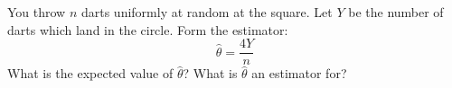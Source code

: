 \documentclass[12pt]{article}
\begin{document}
\begin{enumerate}
You throw $n$ darts uniformly at random at the square. Let $Y$ be the number of darts which land in the circle. Form the estimator:
\[
\hat{\theta} = \frac{4Y}{n}
\]
What is the expected value of $\hat{\theta}$? What is $\hat{\theta}$ an estimator for?

\end{enumerate}
\end{document}
